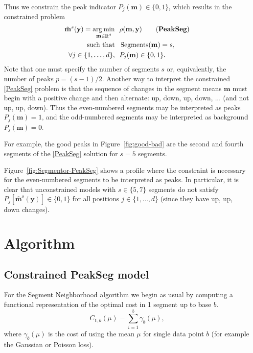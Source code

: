\documentclass{article}
\DeclareMathOperator*{\argmin}{arg\,min}
\DeclareMathOperator*{\Segments}{Segments}
\newcommand{\RR}{\mathbb R}
\begin{document}
Thus we constrain the peak indicator $P_j(\mathbf
m)\in\{0, 1\}$, which results
in the constrained problem
\begin{align*}
  \label{PeakSeg}
  \mathbf{\tilde m}^s(\mathbf y)  =
    \argmin_{\mathbf m\in\RR^{d}} &\ \ 
    \rho(\mathbf m, \mathbf y) 
    \tag{\textbf{PeakSeg}}
\\
    \text{such that} &\ \  \Segments(\mathbf m)=s,  \\
     \forall j\in\{1, \dots, d\}, &\ \ P_j(\mathbf m) \in\{0, 1\}.
\end{align*}
Note that one must specify the number of segments $s$ or,
equivalently, the number of peaks $p=(s-1)/2$. Another way to
interpret the constrained \ref{PeakSeg} problem is that the sequence
of changes in the segment means $\mathbf m$ must begin with a positive
change and then alternate: up, down, up, down, ... (and not up, up,
down). Thus the even-numbered segments may be interpreted as peaks
$P_j(\mathbf m)=1$, and the odd-numbered segments may be interpreted
as background $P_j(\mathbf m)=0$.

For example, the good peaks in Figure~\ref{fig:good-bad} are the
second and fourth segments of the \ref{PeakSeg} solution for $s=5$
segments.

Figure~\ref{fig:Segmentor-PeakSeg} shows a profile where the constraint is
necessary for the even-numbered segments to be interpreted as
peaks. In particular, it is clear that unconstrained models with
$s\in\{5, 7\}$ segments do not satisfy $P_j[\mathbf{\hat m}^s(\mathbf
y)]\in\{0, 1\}$ for all positions $j\in\{1,\dots, d\}$ (since they
have up, up, down changes).

\section{Algorithm}

\subsection{Constrained PeakSeg model}

For the Segment Neighborhood algorithm we begin as usual by computing
a functional representation of the optimal cost in 1 segment up to
base $b$. 
\begin{equation*}
  \label{eq:C1b}
  C_{1,b}(\mu) = \sum_{i=1}^b \gamma_b(\mu),
\end{equation*}
where $\gamma_b(\mu)$ is the cost of using the mean $\mu$ for single
data point $b$ (for example the Gaussian or Poisson loss).
\end{document}
